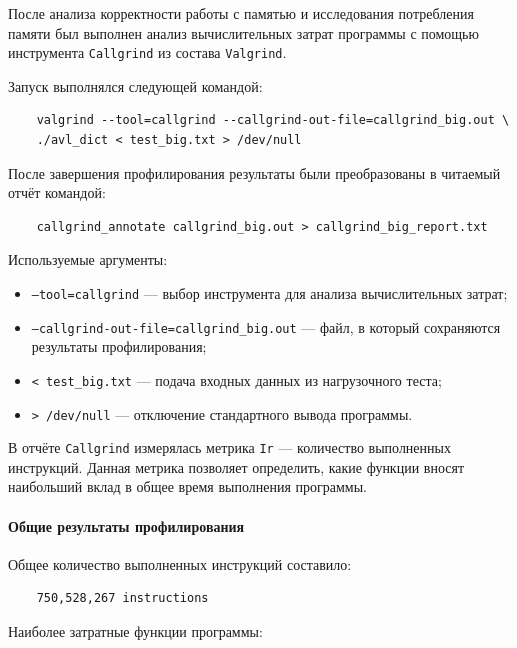 \documentclass[12pt]{article}
\begin{document}
После анализа корректности работы с памятью и исследования потребления памяти был выполнен анализ вычислительных затрат программы с помощью инструмента \texttt{Callgrind} из состава \texttt{Valgrind}.

Запуск выполнялся следующей командой:

\begin{verbatim}
	valgrind --tool=callgrind --callgrind-out-file=callgrind_big.out \
	./avl_dict < test_big.txt > /dev/null
\end{verbatim}

После завершения профилирования результаты были преобразованы в читаемый отчёт командой:

\begin{verbatim}
	callgrind_annotate callgrind_big.out > callgrind_big_report.txt
\end{verbatim}

Используемые аргументы:
\begin{itemize}
	\item \texttt{--tool=callgrind} — выбор инструмента для анализа вычислительных затрат;
	\item \texttt{--callgrind-out-file=callgrind\_big.out} — файл, в который сохраняются результаты профилирования;
	\item \texttt{< test\_big.txt} — подача входных данных из нагрузочного теста;
	\item \texttt{> /dev/null} — отключение стандартного вывода программы.
\end{itemize}

В отчёте \texttt{Callgrind} измерялась метрика \texttt{Ir} — количество выполненных инструкций. Данная метрика позволяет определить, какие функции вносят наибольший вклад в общее время выполнения программы.

\paragraph{Общие результаты профилирования}

Общее количество выполненных инструкций составило:

\begin{verbatim}
	750,528,267 instructions
\end{verbatim}

Наиболее затратные функции программы:
\end{document}

